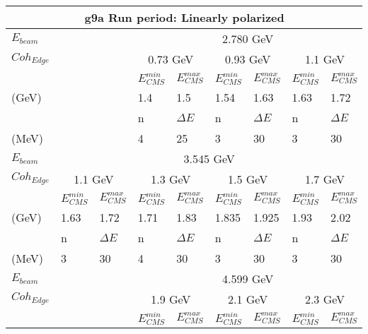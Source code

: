\begin{table}[h]
  \begin{center}
    \begin{tabular}{ |l||l|l||l|l||l|l||l|l||}
      \hline
      \multicolumn{9}{|c|}{g9a Run period: Linearly polarized } \\
      \hline
      \multicolumn{3}{|l||}{$E_{beam}$} & \multicolumn{6}{|c||}{2.780 GeV}   \\
      \hline
      \multicolumn{3}{|l||}{$Coh_{Edge}$} & \multicolumn{2}{|c||}{0.73 GeV} &  \multicolumn{2}{|c||}{0.93 GeV} &  \multicolumn{2}{|c||}{1.1 GeV}   \\
      \hline
      \multicolumn{3}{|l||}{} & $E_{CMS}^{min} $ &  $E_{CMS}^{max} $ & $E_{CMS}^{min} $ &  $E_{CMS}^{max} $ & $E_{CMS}^{min} $ &  $E_{CMS}^{max} $\\
      \multicolumn{3}{|l||}{(GeV)} & 1.4 & 1.5 & 1.54 & 1.63 & 1.63 & 1.72  \\
      \hline
      \multicolumn{3}{|l||}{} & n  &  $\Delta E$ & n  &  $\Delta E$ & n  &  $\Delta E$ \\
      \multicolumn{3}{|l||}{(MeV)} & 4 & 25 & 3 & 30 & 3 & 30  \\
      \hline
      \hline
      $E_{beam}$&  \multicolumn{8}{|c||}{3.545 GeV} \\
      \hline
      $Coh_{Edge}$&  \multicolumn{2}{|c||}{1.1 GeV} &  \multicolumn{2}{|c||}{1.3 GeV} &  \multicolumn{2}{|c||}{1.5 GeV} &  \multicolumn{2}{|c||}{1.7 GeV} \\
      \hline
      & $E_{CMS}^{min} $ &  $E_{CMS}^{max} $& $E_{CMS}^{min} $ &  $E_{CMS}^{max} $ & $E_{CMS}^{min} $ &  $E_{CMS}^{max} $ & $E_{CMS}^{min} $ &  $E_{CMS}^{max} $ \\
      (GeV) & 1.63 & 1.72 & 1.71 & 1.83 & 1.835 & 1.925 &  1.93 & 2.02 \\
      \hline
      & n  &  $\Delta E$ & n  &  $\Delta E$ & n  &  $\Delta E$& n  &  $\Delta E$ \\
      (MeV) & 3 & 30 & 4 & 30 & 3 & 30 &3 &30 \\
      \hline
      \hline
      \multicolumn{3}{|l||}{$E_{beam}$} &  \multicolumn{6}{|c||}{4.599 GeV} \\
      \hline
      \multicolumn{3}{|l||}{$Coh_{Edge}$} &  \multicolumn{2}{|c||}{1.9 GeV} &  \multicolumn{2}{|c||}{2.1 GeV} &  \multicolumn{2}{|c||}{2.3 GeV}  \\
      \hline
      \multicolumn{3}{|l||}{} & $E_{CMS}^{min} $ &  $E_{CMS}^{max} $& $E_{CMS}^{min} $ &  $E_{CMS}^{max} $ & $E_{CMS}^{min} $ &  $E_{CMS}^{max} $ \\

\end{tabular}
\end{center}
\end{table}
